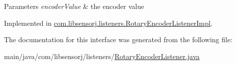 \begin{DoxyParams}{Parameters}
{\em encoder\+Value} & the encoder value \\
\hline
\end{DoxyParams}


Implemented in \hyperlink{classcom_1_1libsensorj_1_1listeners_1_1RotaryEncoderListenerImpl_a7c07901b6fbfe89c7406afa8fcf4d482}{com.\+libsensorj.\+listeners.\+Rotary\+Encoder\+Listener\+Impl}.



The documentation for this interface was generated from the following file\+:\begin{DoxyCompactItemize}
\item 
main/java/com/libsensorj/listeners/\hyperlink{RotaryEncoderListener_8java}{Rotary\+Encoder\+Listener.\+java}\end{DoxyCompactItemize}
